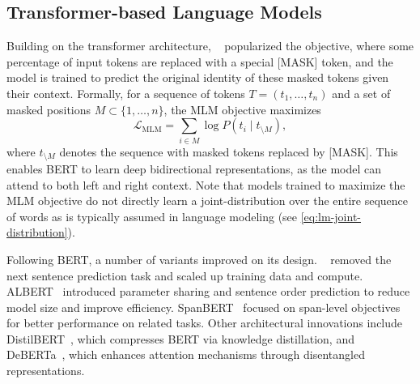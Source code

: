 
\subsection{Transformer-based Language Models}

Building on the transformer architecture, ~\citep{devlin2019bert} popularized the  objective, where some percentage of input tokens are replaced with a special [MASK] token, and the model is trained to predict the original identity of these masked tokens given their context. Formally, for a sequence of tokens $T = (t_1, \ldots, t_n)$ and a set of masked positions $M \subset \{1, \ldots, n\}$, the MLM objective maximizes
\begin{equation}
    \mathcal{L}_{\text{MLM}} = \sum_{i \in M} \log P(t_i \mid t_{\setminus M}),
\end{equation}
where $t_{\setminus M}$ denotes the sequence with masked tokens replaced by [MASK]. This enables BERT to learn deep bidirectional representations, as the model can attend to both left and right context. Note that models trained to maximize the MLM objective do not directly learn a joint-distribution over the entire sequence of words as is typically assumed in language modeling (see \cref{eq:lm-joint-distribution}).

Following BERT, a number of variants improved on its design. ~\citep{liu2019roberta} removed the next sentence prediction task and scaled up training data and compute. ALBERT~\citep{lan2019albert} introduced parameter sharing and sentence order prediction to reduce model size and improve efficiency. SpanBERT~\citep{joshi2020spanbert} focused on span-level objectives for better performance on related tasks. Other architectural innovations include DistilBERT~\citep{sanh2019distilbert}, which compresses BERT via knowledge distillation, and DeBERTa~\citep{he2021deberta}, which enhances attention mechanisms through disentangled representations.

